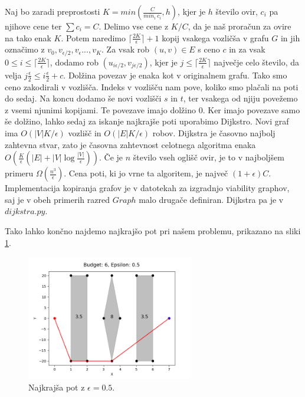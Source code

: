 \documentclass{article}
\begin{document}
Naj bo  zaradi preprostosti $K = min(\frac{C}{min_i \ c_i}, h)$, kjer je $h$ število ovir, $c_i$ pa njihove cene ter $\sum c_i = C$. Delimo vse cene z $K/C$, da je naš proračun za ovire na tako enak $K$. Potem naredimo $ \lceil{\frac{2K}{\epsilon}}\rceil + 1$  kopij vsakega vozličša v grafu $G$ in jih označimo z $v_0, v_{\epsilon/2}, v_{\epsilon}..., v_K$. Za vsak rob $(u, v) \in E$ s ceno $c$ in za vsak $0 \le i \le \lceil{\frac{2K}{\epsilon}}\rceil $, dodamo rob $(u_{i \epsilon/2}, v_{j \epsilon/2})$, kjer je $j\le\lceil{\frac{2K}{\epsilon}}\rceil$ največje celo število, da velja $j\frac{\epsilon}{2}
 \le i \frac{\epsilon}{2} + c$. Dolžina povezav je enaka kot v originalnem grafu. Tako smo ceno zakodirali v vozlišča. Indeks v vozlišču nam pove, koliko smo plačali na poti do sedaj. Na koncu dodamo še novi vozlišči $s$ in $t$, ter vsakega od njiju povežemo z vsemi njunimi kopijami. Te povezave imajo dolžino $0$. Ker imajo povezave samo še dolžino, lahko sedaj za iskanje najkrajše poti uporabimo Dijkstro. Novi graf ima $O(|V|K/\epsilon)$ vozlišč in $O(|E|K/\epsilon)$ robov. Dijkstra  je  časovno najbolj zahtevna stvar, zato je časovna zahtevnost celotnega algoritma enaka $O(\frac{K}{\epsilon}(|E| + |V|\log\frac{|V|}{\epsilon}) )$. Če je $n$ število vseh oglišč ovir, je to v najboljšem primeru $\Omega(\frac{n^3}{\epsilon})$. Cena poti, ki jo vrne ta algoritem, je največ $(1 + \epsilon)C$. Implementacija kopiranja grafov je v datotekah za izgradnjo viability graphov, saj je v obeh primerih razred $Graph$ malo drugače definiran. Dijkstra pa je v $dijkstra.py$.

 Tako lahko končno najdemo najkrajšo pot pri našem problemu, prikazano na sliki \ref{fig:errP1}.

 \begin{figure}[ht]
    \centering
    \includegraphics[width=0.65\textwidth]{errPath1.png}
    \caption{Najkrajša pot z $\epsilon = 0.5$.}
    \label{fig:errP1}
\end{figure}
\end{document}
